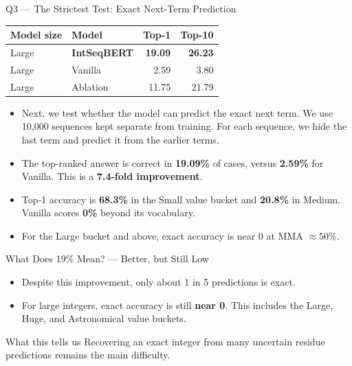 \documentclass[aspectratio=169,10pt]{beamer}
\newcommand{\tightlist}{\setlength{\itemsep}{0.2em}}
\newcommand{\readout}[1]{\textcolor{readoutblue}{{\mdseries #1}}}
\begin{document}
\begin{frame}{Q3 --- The Strictest Test: Exact Next-Term Prediction}
\small
  \begin{center}\small
    \begin{tabular}{llrr}
      \toprule
      Model size & Model & Top-1 & Top-10 \\
      \midrule
      Large & \textbf{IntSeqBERT} & \textbf{19.09} & \textbf{26.23} \\
      Large & Vanilla             & 2.59           & 3.80 \\
      Large & Ablation            & 11.75          & 21.79 \\
      \bottomrule
    \end{tabular}
  \end{center}

  \begin{itemize}\tightlist
    \item \readout{Next, we test whether the model can predict the exact next term. We use 10,000 sequences kept separate from training.}
          For each sequence, we hide the last term and predict it from the earlier terms.
    \item \readout{The top-ranked answer is correct in \textbf{19.09\%} of cases, versus \textbf{2.59\%} for Vanilla.}
          \readout{This is a \textbf{7.4-fold improvement}.}
    \item Top-1 accuracy is \textbf{68.3\%} in the Small value bucket and \textbf{20.8\%} in Medium.
          Vanilla scores \textbf{0\%} beyond its vocabulary.
    \item For the Large bucket and above, exact accuracy is near 0 at MMA $\approx 50\%$.
  \end{itemize}
\end{frame}

\begin{frame}{What Does 19\% Mean? --- Better, but Still Low}
\begin{itemize}\tightlist
    \item \readout{Despite this improvement, only about 1 in 5 predictions is exact.}
    \item \readout{For large integers, exact accuracy is still \textbf{near 0}.}
          This includes the Large, Huge, and Astronomical value buckets.
  \end{itemize}
  \begin{alertblock}{What this tells us}
    \readout{Recovering an exact integer from many uncertain residue predictions remains the main difficulty.}
  \end{alertblock}
\end{frame}
\end{document}
